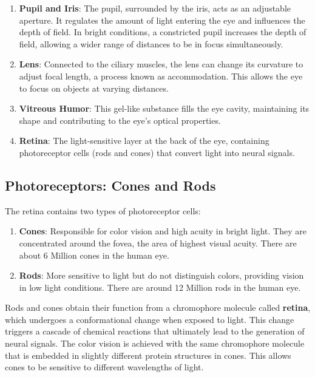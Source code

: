 \documentclass[
  a4paper,
]{book}
\begin{document}
\begin{enumerate}
\def\labelenumi{\arabic{enumi}.}
\item
  \textbf{Pupil and Iris}: The pupil, surrounded by the iris, acts as an
  adjustable aperture. It regulates the amount of light entering the eye
  and influences the depth of field. In bright conditions, a constricted
  pupil increases the depth of field, allowing a wider range of
  distances to be in focus simultaneously.
\item
  \textbf{Lens}: Connected to the ciliary muscles, the lens can change
  its curvature to adjust focal length, a process known as
  accommodation. This allows the eye to focus on objects at varying
  distances.
\item
  \textbf{Vitreous Humor}: This gel-like substance fills the eye cavity,
  maintaining its shape and contributing to the eye's optical
  properties.
\item
  \textbf{Retina}: The light-sensitive layer at the back of the eye,
  containing photoreceptor cells (rods and cones) that convert light
  into neural signals.
\end{enumerate}

\subsection{Photoreceptors: Cones and
Rods}\label{photoreceptors-cones-and-rods}

The retina contains two types of photoreceptor cells:

\begin{enumerate}
\def\labelenumi{\arabic{enumi}.}
\item
  \textbf{Cones}: Responsible for color vision and high acuity in bright
  light. They are concentrated around the fovea, the area of highest
  visual acuity. There are about 6 Million cones in the human eye.
\item
  \textbf{Rods}: More sensitive to light but do not distinguish colors,
  providing vision in low light conditions. There are around 12 Million
  rods in the human eye.
\end{enumerate}

Rods and cones obtain their function from a chromophore molecule called
\textbf{retina}, which undergoes a conformational change when exposed to
light. This change triggers a cascade of chemical reactions that
ultimately lead to the generation of neural signals. The color vision is
achieved with the same chromophore molecule that is embedded in slightly
different protein structures in cones. This allows cones to be sensitive
to different wavelengths of light.
\end{document}
